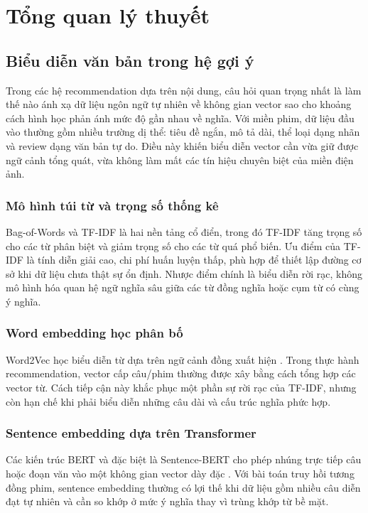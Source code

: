 \chapter{Tổng quan lý thuyết}

\section{Biểu diễn văn bản trong hệ gợi ý}
Trong các hệ recommendation dựa trên nội dung, câu hỏi quan trọng nhất là làm thế nào ánh xạ dữ liệu ngôn ngữ tự nhiên về không gian vector sao cho khoảng cách hình học phản ánh mức độ gần nhau về nghĩa. Với miền phim, dữ liệu đầu vào thường gồm nhiều trường dị thể: tiêu đề ngắn, mô tả dài, thể loại dạng nhãn và review dạng văn bản tự do. Điều này khiến biểu diễn vector cần vừa giữ được ngữ cảnh tổng quát, vừa không làm mất các tín hiệu chuyên biệt của miền điện ảnh.

\subsection{Mô hình túi từ và trọng số thống kê}
Bag-of-Words và TF-IDF là hai nền tảng cổ điển, trong đó TF-IDF tăng trọng số cho các từ phân biệt và giảm trọng số cho các từ quá phổ biến. Ưu điểm của TF-IDF là tính diễn giải cao, chi phí huấn luyện thấp, phù hợp để thiết lập đường cơ sở khi dữ liệu chưa thật sự ổn định. Nhược điểm chính là biểu diễn rời rạc, không mô hình hóa quan hệ ngữ nghĩa sâu giữa các từ đồng nghĩa hoặc cụm từ có cùng ý nghĩa.

\subsection{Word embedding học phân bố}
Word2Vec học biểu diễn từ dựa trên ngữ cảnh đồng xuất hiện \cite{mikolov2013word2vec}. Trong thực hành recommendation, vector cấp câu/phim thường được xây bằng cách tổng hợp các vector từ. Cách tiếp cận này khắc phục một phần sự rời rạc của TF-IDF, nhưng còn hạn chế khi phải biểu diễn những câu dài và cấu trúc nghĩa phức hợp.

\subsection{Sentence embedding dựa trên Transformer}
Các kiến trúc BERT và đặc biệt là Sentence-BERT cho phép nhúng trực tiếp câu hoặc đoạn văn vào một không gian vector dày đặc \cite{devlin2019bert,reimers2019sentencebert}. Với bài toán truy hồi tương đồng phim, sentence embedding thường có lợi thế khi dữ liệu gồm nhiều câu diễn đạt tự nhiên và cần so khớp ở mức ý nghĩa thay vì trùng khớp từ bề mặt.

